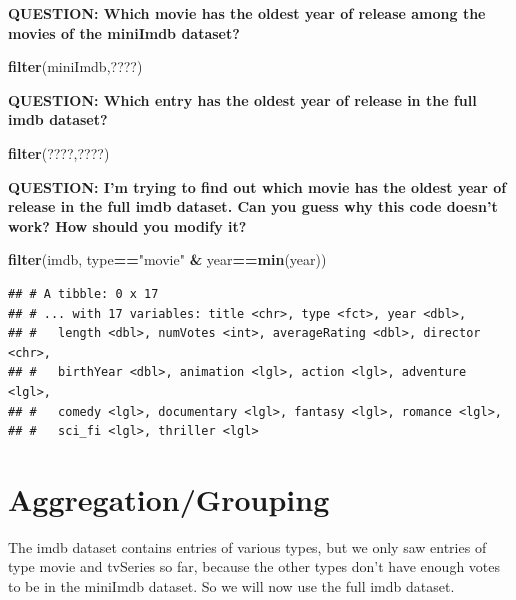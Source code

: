 \documentclass[]{book}
\newenvironment{Shaded}{\begin{snugshade}}{\end{snugshade}}
\newcommand{\KeywordTok}[1]{\textcolor[rgb]{0.13,0.29,0.53}{\textbf{#1}}}
\newcommand{\NormalTok}[1]{#1}
\newcommand{\OperatorTok}[1]{\textcolor[rgb]{0.81,0.36,0.00}{\textbf{#1}}}
\newcommand{\StringTok}[1]{\textcolor[rgb]{0.31,0.60,0.02}{#1}}
\begin{document}
\textbf{QUESTION: Which movie has the oldest year of release among the movies of the miniImdb dataset?}

\begin{Shaded}
\begin{Highlighting}[]
\KeywordTok{filter}\NormalTok{(miniImdb,????)}
\end{Highlighting}
\end{Shaded}

\textbf{QUESTION: Which entry has the oldest year of release in the full imdb dataset?}

\begin{Shaded}
\begin{Highlighting}[]
\KeywordTok{filter}\NormalTok{(????,????)}
\end{Highlighting}
\end{Shaded}

\textbf{QUESTION: I'm trying to find out which movie has the oldest year of release in the full imdb dataset. Can you guess why this code doesn't work? How should you modify it?}

\begin{Shaded}
\begin{Highlighting}[]
\KeywordTok{filter}\NormalTok{(imdb, type}\OperatorTok{==}\StringTok{"movie"} \OperatorTok{&}\StringTok{ }\NormalTok{year}\OperatorTok{==}\KeywordTok{min}\NormalTok{(year))}
\end{Highlighting}
\end{Shaded}

\begin{verbatim}
## # A tibble: 0 x 17
## # ... with 17 variables: title <chr>, type <fct>, year <dbl>,
## #   length <dbl>, numVotes <int>, averageRating <dbl>, director <chr>,
## #   birthYear <dbl>, animation <lgl>, action <lgl>, adventure <lgl>,
## #   comedy <lgl>, documentary <lgl>, fantasy <lgl>, romance <lgl>,
## #   sci_fi <lgl>, thriller <lgl>
\end{verbatim}

\hypertarget{aggregationgrouping}{%
\section{Aggregation/Grouping}\label{aggregationgrouping}}

The imdb dataset contains entries of various types, but we only saw entries of type movie and tvSeries so far, because the other types don't have enough votes to be in the miniImdb dataset. So we will now use the full imdb dataset.
\end{document}
